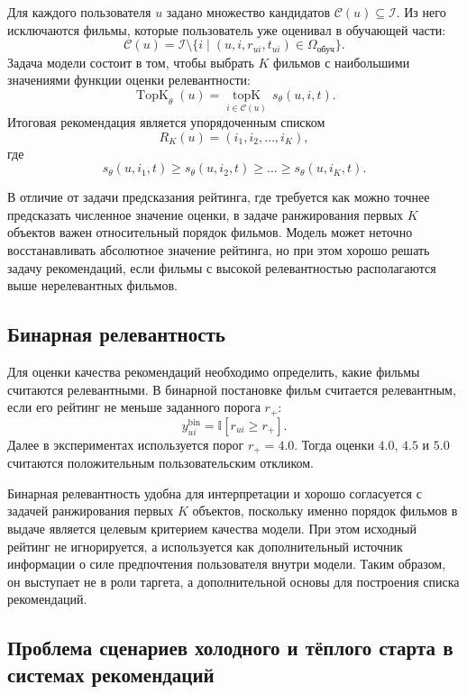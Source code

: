 \documentclass[12pt,fleqn]{article}
\begin{document}
Для каждого пользователя $u$ задано множество кандидатов $\mathcal{C}(u) \subseteq \mathcal{I}$. Из него исключаются фильмы, которые пользователь уже оценивал в обучающей части:
$$
    \mathcal{C}(u)=
    \mathcal{I}\setminus
    \{i \mid (u,i,r_{ui},t_{ui})\in\Omega_{\text{обуч}}\}.
$$
Задача модели состоит в том, чтобы выбрать $K$ фильмов с наибольшими значениями функции оценки релевантности:
$$
    \operatorname{TopK}_{\theta}(u)=
    \underset{i\in\mathcal{C}(u)}{\operatorname{topK}}\,
    s_{\theta}(u,i,t).
$$
Итоговая рекомендация является упорядоченным списком
$$
    R_K(u)=(i_1,i_2,\ldots,i_K),
$$
где
$$
    s_{\theta}(u,i_1,t)\geq
    s_{\theta}(u,i_2,t)\geq
    \ldots\geq
    s_{\theta}(u,i_K,t).
$$

В отличие от задачи предсказания рейтинга, где требуется как можно точнее предсказать численное значение оценки, в задаче ранжирования первых $K$ объектов важен относительный порядок фильмов. Модель может неточно восстанавливать абсолютное значение рейтинга, но при этом хорошо решать задачу рекомендаций, если фильмы с высокой релевантностью располагаются выше нерелевантных фильмов.

\subsection{Бинарная релевантность}

Для оценки качества рекомендаций необходимо определить, какие фильмы считаются релевантными. В бинарной постановке фильм считается релевантным, если его рейтинг не меньше заданного порога $r_{+}$:
$$
    y^{\mathrm{bin}}_{ui}=\mathbb{I}[r_{ui}\geq r_{+}].
$$
Далее в экспериментах используется порог
$
    r_{+}=4.0.
$
Тогда оценки $4.0$, $4.5$ и $5.0$ считаются положительным пользовательским откликом.

Бинарная релевантность удобна для интерпретации и хорошо согласуется с задачей ранжирования первых $K$ объектов, поскольку именно порядок фильмов в выдаче является целевым критерием качества модели. При этом исходный рейтинг не игнорируется, а используется как дополнительный источник информации о силе предпочтения пользователя внутри модели. Таким образом, он выступает не в роли таргета, а дополнительной основы для построения списка рекомендаций.


\subsection{Проблема сценариев холодного и тёплого старта в системах рекомендаций}
\end{document}
